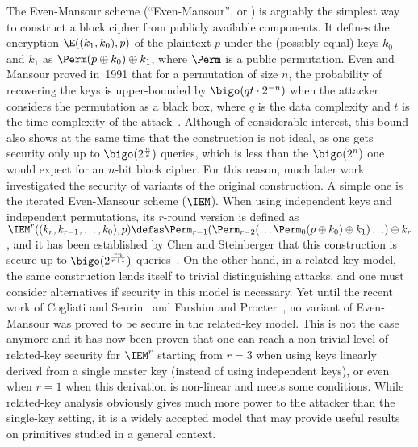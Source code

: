 The Even-Mansour scheme (``Even-Mansour'', or \EM) is arguably the simplest way to construct a block cipher from publicly available
components. It defines the encryption $\E((k_1, k_0), p)$ of the plaintext $p$ under the (possibly equal) keys $k_0$
and $k_1$ as $\Perm(p \oplus k_0) \oplus k_1$, where $\Perm$ is a public permutation. Even and Mansour proved
in~1991 that for a permutation of size $n$, the probability of recovering the keys
is upper-bounded by $\bigo(qt \cdot 2^{-n})$ when the attacker considers the permutation as a black box,
where $q$ is the data complexity and $t$ is the time
complexity of the attack~\cite{EM}. Although
of considerable interest, this bound also shows at the same time that the construction is not ideal,
as one gets security only up to $\bigo(2^\frac{n}{2})$ queries, which
is less than the $\bigo(2^n)$ one would expect for an $n$-bit block cipher. For this
reason, much later work investigated the security of variants of the original construction. A simple
one is the iterated Even-Mansour scheme ($\IEM$). When using independent keys and independent permutations,
its $r$-round version is defined as
$\IEM^r((k_r, k_{r-1}, \ldots, k_0), p) \defas \Perm_{r-1}(\Perm_{r-2}(\ldots\Perm_0\linebreak[1](p \oplus k_0) \oplus k_1)\ldots) \oplus k_r$,
and it has been established by Chen and Steinberger that this construction is secure up to $\bigo(2^\frac{rn}{r+1})$ queries~\cite{CS14}.
On the other hand, in a related-key model, the same construction lends itself to trivial
distinguishing attacks, and one must consider alternatives if security in this model is necessary.
Yet until the recent work of Cogliati and Seurin~\cite{CS15} and Farshim and Procter~\cite{FP14},
no variant of Even-Mansour was proved to be secure in the related-key model. This is not the case
anymore and it has now been proven that one can reach a non-trivial level of related-key security for $\IEM^r$
starting from $r = 3$ when using keys linearly derived from a single master key (instead
of using independent keys), or even when $r = 1$
when this derivation is non-linear and meets some conditions.
While related-key analysis obviously gives much more power to the attacker than the
single-key setting, it is a widely accepted
model that may provide useful results on primitives studied in a general context.

